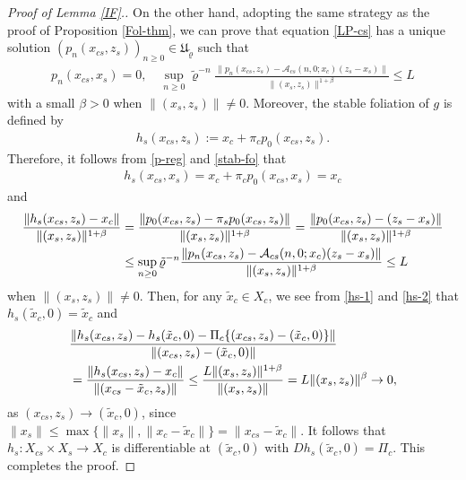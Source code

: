 \documentclass[reqno]{amsart}
\numberwithin{equation}{section}
\begin{document}
\begin{proof}[Proof of Lemma {\rm \ref{IF}.}]
On the other hand, adopting the same strategy as the proof of Proposition \ref{Fol-thm},
we can prove that equation \eqref{LP-cs} has a unique solution $(p_n(x_{cs},z_s))_{n\ge 0}\in \mathfrak{U}_{\tilde{\varrho}}$ such that
\begin{align}\label{p-reg}
p_n(x_{cs},x_s)=0,\quad
\sup_{n\ge0}\tilde{\varrho}^{-n}\frac{\|p_n(x_{cs},z_s)-\mathcal{A}_{cs}(n,0;x_c)(z_s-x_s)\|}{\|(x_s,z_s)\|^{1+\beta}}\le L
\end{align}
with a small $\beta>0$ when $\|(x_s,z_s)\|\ne 0$.
Moreover,
the stable foliation of $g$ is defined by
\begin{align}\label{stab-fo}
h_s(x_{cs},z_s):=x_c+\pi_c p_0(x_{cs},z_s).
\end{align}
Therefore, it follows from \eqref{p-reg}  and \eqref{stab-fo}    that
\begin{align}\label{hs-1}
h_s(x_{cs},x_s)=x_c+\pi_c p_0(x_{cs},x_s)=x_c
\end{align}
and
\begin{align}\label{hs-2}
\frac{\|h_s(x_{cs},z_s)-x_c\|}{\|(x_s,z_s)\|^{1+\beta}}
&=\frac{\|p_0(x_{cs},z_s)-\pi_s p_0(x_{cs},z_s)\|}{\|(x_s,z_s)\|^{1+\beta}}
= \frac{\|p_0(x_{cs},z_s)-(z_s-x_s)\|}{\|(x_s,z_s)\|^{1+\beta}}
\notag \\
&\le\sup_{n\ge0}\tilde{\varrho}^{-n}\frac{\|p_n(x_{cs},z_s)-\mathcal{A}_{cs}(n,0;x_c)(z_s-x_s)\|}{\|(x_s,z_s)\|^{1+\beta}}\le L
\end{align}
when $\|(x_s,z_s)\|\ne 0$.
Then, for any $\tilde{x}_c\in X_c$, we see from \eqref{hs-1} and \eqref{hs-2} that $h_s(\tilde{x}_c,0)=\tilde{x}_c$ and
\begin{align*}
&\frac{\|h_s(x_{cs},z_s)-h_s(\tilde{x}_c,0)- \Pi_{c}\{(x_{cs},z_s)-(\tilde{x}_c,0)\}\|}{\|(x_{cs},z_s)-(\tilde{x}_c,0)\|}
\notag \\
&= \frac{\|h_s(x_{cs},z_s)-x_c\|}{\|(x_{cs}-\tilde{x}_c,z_s)\|}
\le \frac{L\|(x_s,z_s)\|^{1+\beta}}{\|(x_s,z_s)\|}
= L\|(x_s,z_s)\|^{\beta} \to 0,
\end{align*}
as $ (x_{cs},z_s)\to (\tilde{x}_c,0)$,
since $\|x_s\|\le \max\{\|x_s\|,\|x_c-\tilde x_c\|\}=\|x_{cs}-\tilde{x}_c\|$.
It follows that  $h_s:X_{cs}\times X_s\to X_c$ is differentiable at $(\tilde{x}_c,0)$ with $Dh_s(\tilde{x}_{c},0)=\Pi_c$.
This completes the proof.
\end{proof}
\end{document}
